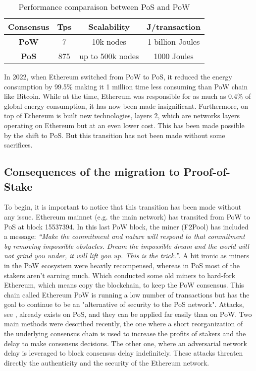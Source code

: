 \documentclass{ifacconf}
\begin{document}
\begin{table}
\begin{center}
\caption{Performance comparaison between PoS and PoW}\label{tb:margins}
\begin{tabular}{cccc}
Consensus & Tps & Scalability & J/transaction \\\hline
\textbf{PoW} & 7 & 10k nodes & 1 billion Joules \\
\textbf{PoS} & 875 & up to 500k nodes & 1000 Joules \\ \hline
\end{tabular}
\end{center}
\end{table}
\pagebreak
\hfill \break
In 2022, when Ethereum switched from PoW to PoS, it reduced the energy consumption by 99.5\% making it 1 million time less consuming than PoW chain like Bitcoin. \citep[reference.][]{FTSE:22} While at the time, Ethereum was responsible for as much as 0.4\% of global energy consumption, it has now been made insignificant. Furthermore, on top of Ethereum is built new technologies, layers 2, which are networks layers operating on Ethereum but at an even lower cost. This has been made possible by the shift to PoS. But this transition has not been made without some sacrifices. 

\subsection{Consequences of the migration to Proof-of-Stake}

To begin, it is important to notice that this transition has been made without any issue. Ethereum mainnet (e.g. the main network) has transited from PoW to PoS at block 15537394. In this last PoW block, the miner (F2Pool) has included a message:\hfill \break
\textit{“Make the commitment and nature will respond to that commitment by removing impossible obstacles. Dream the impossible dream and the world will not grind you under, it will lift you up. This is the trick.”}. \hfill \break \break A bit ironic as miners in the PoW ecosystem were heavily recompensed, whereas in PoS most of the stakers aren't earning much. Which conducted some old miners to hard-fork Ethereum, which means copy the blockchain, to keep the PoW consensus. This chain called Ethereum PoW is running a low number of transactions but has the goal to continue to be an "alternative of security to the PoS network". Attacks, see \citep[reference.][]{Stanford:22}, already exists on PoS, and they can be applied far easily than on PoW. Two main methods were described recently, the one where a short reorganization of the underlying consensus chain is used to increase the profits of stakers and the delay to make consensus decisions. The other one, where an adversarial network delay is leveraged to block consensus delay indefinitely. These attacks threaten directly the authenticity and the security of the Ethereum network.
\end{document}
